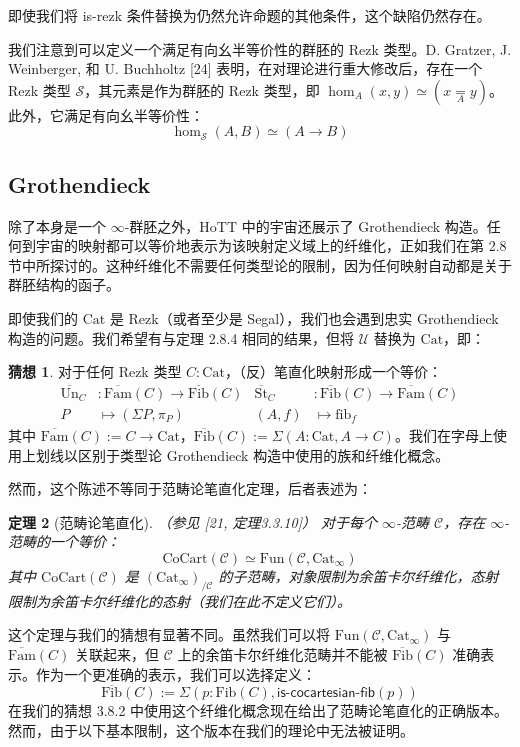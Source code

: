 \documentclass{ctexrep}
\theoremstyle{plain}
\newtheorem{theorem}{定理}[section]
\theoremstyle{definition}
\theoremstyle{remark}
\theoremstyle{definition}
\theoremstyle{definition}
\newtheorem{conjecture}[theorem]{猜想}
\theoremstyle{definition}
\newcommand{\coloneqq}{\mathrel{:=}}
\newcommand{\UU}{\mathcal{U}}
\newcommand{\Cat}{\mathrm{Cat}}
\newcommand{\CoCart}{\mathrm{CoCart}}
\newcommand{\Fun}{\mathrm{Fun}}
\newcommand{\Fam}{\mathrm{Fam}}
\newcommand{\Fib}{\mathrm{Fib}}
\begin{document}
即使我们将 is-rezk 条件替换为仍然允许命题的其他条件，这个缺陷仍然存在。

我们注意到可以定义一个满足有向幺半等价性的群胚的 Rezk 类型。D. Gratzer, J. Weinberger, 和 U. Buchholtz [24] 表明，在对理论进行重大修改后，存在一个 Rezk 类型 $\mathcal{S}$，其元素是作为群胚的 Rezk 类型，即 $\hom_A(x,y) \simeq (x \underset{A}{=} y)$。此外，它满足有向幺半等价性：
\[
\hom_{\mathcal{S}}(A,B) \simeq (A \to B)
\]

\subsection{Grothendieck}

除了本身是一个 $\infty$-群胚之外，HoTT 中的宇宙还展示了 Grothendieck 构造。任何到宇宙的映射都可以等价地表示为该映射定义域上的纤维化，正如我们在第 2.8 节中所探讨的。这种纤维化不需要任何类型论的限制，因为任何映射自动都是关于群胚结构的函子。

即使我们的 $\Cat$ 是 Rezk（或者至少是 Segal），我们也会遇到忠实 Grothendieck 构造的问题。我们希望有与定理 2.8.4 相同的结果，但将 $\UU$ 替换为 $\Cat$，即：

\begin{conjecture}
对于任何 Rezk 类型 $C:\Cat$，（反）笔直化映射形成一个等价：
\begin{align*}
    \overline{\text{Un}}_C &: \overline{\text{Fam}}(C) \to \overline{\text{Fib}}(C) & \overline{\text{St}}_C &: \overline{\text{Fib}}(C) \to \overline{\text{Fam}}(C) \\
    P &\mapsto (\Sigma P, \pi_P) & (A, f) &\mapsto \text{fib}_f
\end{align*}
其中 $\overline{\Fam}(C) \coloneqq C \to \Cat$，$\overline{\Fib}(C) \coloneqq \Sigma(A:\Cat, A \to C)$。我们在字母上使用上划线以区别于类型论 Grothendieck 构造中使用的族和纤维化概念。
\end{conjecture}

然而，这个陈述不等同于范畴论笔直化定理，后者表述为：

\begin{theorem}[范畴论笔直化]（参见 [21, 定理3.3.10]）
对于每个 $\infty$-范畴 $\mathcal{C}$，存在 $\infty$-范畴的一个等价：
\[
\CoCart(\mathcal{C}) \simeq \Fun(\mathcal{C}, \Cat_{\infty})
\]
其中 $\CoCart(\mathcal{C})$ 是 $(\Cat_{\infty})_{/\mathcal{C}}$ 的子范畴，对象限制为余笛卡尔纤维化，态射限制为余笛卡尔纤维化的态射（我们在此不定义它们）。
\end{theorem}

这个定理与我们的猜想有显著不同。虽然我们可以将 $\Fun(\mathcal{C}, \Cat_{\infty})$ 与 $\overline{\Fam}(C)$ 关联起来，但 $\mathcal{C}$ 上的余笛卡尔纤维化范畴并不能被 $\overline{\Fib}(C)$ 准确表示。作为一个更准确的表示，我们可以选择定义：
\[
\overline{\Fib}(C) \coloneqq \Sigma(p:\Fib(C), \mathsf{is\text{-}cocartesian\text{-}fib}(p))
\]
在我们的猜想 3.8.2 中使用这个纤维化概念现在给出了范畴论笔直化的正确版本。然而，由于以下基本限制，这个版本在我们的理论中无法被证明。
\end{document}
